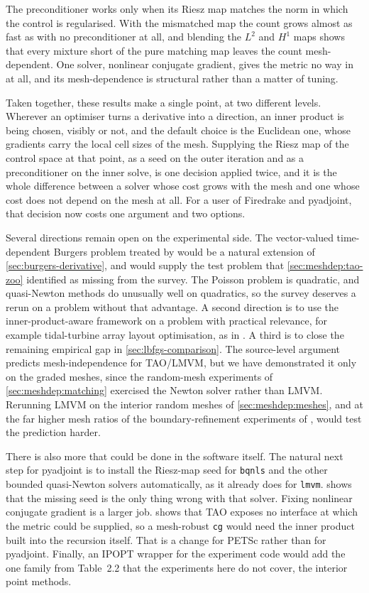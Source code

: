 \documentclass[a4paper,11pt]{article}
\theoremstyle{spacedplain} \newtheorem{theorem}[counter]{Theorem} \newtheorem{lemma}[counter]{Lemma} \newtheorem{prop}[counter]{Proposition} \newtheorem{cor}[counter]{Corollary}
\theoremstyle{spaceddefinition} \newtheorem{defn}[counter]{Definition} \newtheorem{example}[counter]{Example} \newtheorem{remark}[counter]{Remark}
\begin{document}
The preconditioner works only when its Riesz map matches the norm in which the control is regularised. With the mismatched map the count grows almost as fast as with no preconditioner at all, and blending the $L^{2}$ and $H^{1}$ maps shows that every mixture short of the pure matching map leaves the count mesh-dependent. One solver, nonlinear conjugate gradient, gives the metric no way in at all, and its mesh-dependence is structural rather than a matter of tuning.

Taken together, these results make a single point, at two different levels. Wherever an optimiser turns a derivative into a direction, an inner product is being chosen, visibly or not, and the default choice is the Euclidean one, whose gradients carry the local cell sizes of the mesh. Supplying the Riesz map of the control space at that point, as a seed on the outer iteration and as a preconditioner on the inner solve, is one decision applied twice, and it is the whole difference between a solver whose cost grows with the mesh and one whose cost does not depend on the mesh at all. For a user of Firedrake and pyadjoint, that decision now costs one argument and two options.

Several directions remain open on the experimental side. The vector-valued time-dependent Burgers problem treated by \citet[Sect.~1.4.5]{shfp2017} would be a natural extension of \cref{sec:burgers-derivative}, and would supply the test problem that \cref{sec:meshdep:tao-zoo} identified as missing from the survey. The Poisson problem is quadratic, and quasi-Newton methods do unusually well on quadratics, so the survey deserves a rerun on a problem without that advantage. A second direction is to use the inner-product-aware framework on a problem with practical relevance, for example tidal-turbine array layout optimisation, as in \citet[Chap.~3]{shfp2017}. A third is to close the remaining empirical gap in \cref{sec:lbfgs-comparison}. The source-level argument predicts mesh-independence for TAO/LMVM, but we have demonstrated it only on the graded meshes, since the random-mesh experiments of \cref{sec:meshdep:matching} exercised the Newton solver rather than LMVM. Rerunning LMVM on the interior random meshes of \cref{sec:meshdep:meshes}, and at the far higher mesh ratios of the boundary-refinement experiments of \citet[Sect.~2.2.5]{shfp2017}, would test the prediction harder.

There is also more that could be done in the software itself. The natural next step for pyadjoint is to install the Riesz-map seed for \texttt{bqnls} and the other bounded quasi-Newton solvers automatically, as it already does for \texttt{lmvm}.  shows that the missing seed is the only thing wrong with that solver. Fixing nonlinear conjugate gradient is a larger job.  shows that TAO exposes no interface at which the metric could be supplied, so a mesh-robust \texttt{cg} would need the inner product built into the recursion itself. That is a change for PETSc rather than for pyadjoint. Finally, an IPOPT wrapper for the experiment code would add the one family from Table~2.2 that the experiments here do not cover, the interior point methods.
\end{document}
